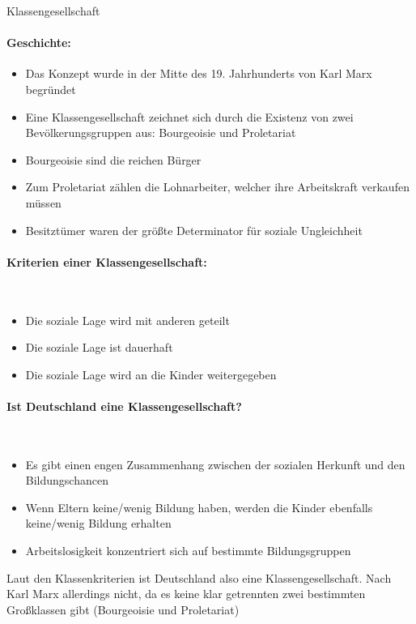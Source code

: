 \documentclass[11pt,a4paper]{report}
\begin{document}
	\Large Klassengesellschaft
	\normalsize
	\vspace{1cm}
	\paragraph{Geschichte:}
	\begin{itemize}
		\item Das Konzept wurde in der Mitte des 19. Jahrhunderts von Karl Marx begründet
		\item Eine Klassengesellschaft zeichnet sich durch die Existenz von zwei Bevölkerungsgruppen aus: Bourgeoisie und Proletariat
		\item Bourgeoisie sind die reichen Bürger
		\item Zum Proletariat zählen die Lohnarbeiter, welcher ihre Arbeitskraft verkaufen müssen
		\item Besitztümer waren der größte Determinator für soziale Ungleichheit
	\end{itemize}
	\paragraph{Kriterien einer Klassengesellschaft:} \mbox{} \\
	\begin{itemize}
		\item Die soziale Lage wird mit anderen geteilt
		\item Die soziale Lage ist dauerhaft
		\item Die soziale Lage wird an die Kinder weitergegeben
	\end{itemize}
	\paragraph{Ist Deutschland eine Klassengesellschaft?} \mbox{} \\
	\begin{itemize}
		\item Es gibt einen engen Zusammenhang zwischen der sozialen Herkunft und den Bildungschancen
		\item Wenn Eltern keine/wenig Bildung haben, werden die Kinder ebenfalls keine/wenig Bildung erhalten
		\item Arbeitslosigkeit konzentriert sich auf bestimmte Bildungsgruppen
	\end{itemize}
	Laut den Klassenkriterien ist Deutschland also eine Klassengesellschaft.
	Nach Karl Marx allerdings nicht, da es keine klar getrennten zwei bestimmten Großklassen gibt (Bourgeoisie und Proletariat)
\end{document}
